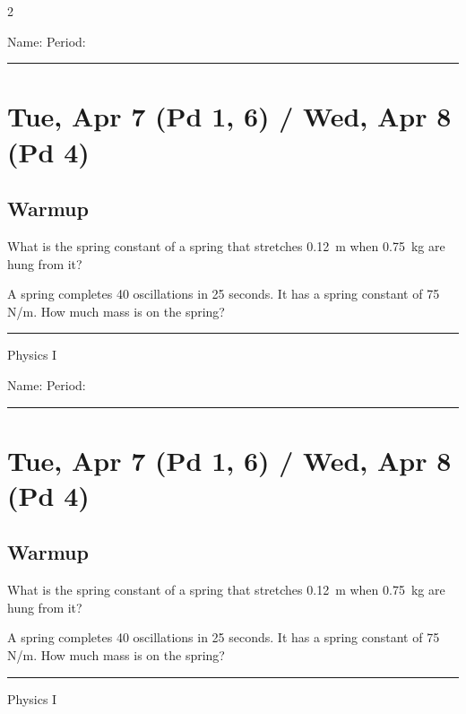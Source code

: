 \documentclass[10pt,landscape]{exam}
\def\todayDate{Tue, Apr 7 (Pd 1, 6) / Wed, Apr 8 (Pd 4)}
\def\content{
  \begin{questions}
    \question
      What is the spring constant of a spring that stretches 0.12~m when 0.75~kg are hung from it?
      \vspace{18em}

    \question
      A spring completes 40 oscillations in 25 seconds.  It has a spring constant of 75 N/m.  How much mass is on the spring?
  \end{questions}

}
\begin{document}
\pagestyle{empty}

\setlength{\columnsep}{0.8in}
\begin{multicols*}{2}

\noindent  
Name: \hfill Period: \hspace{5em}
\vspace{0.5em}
\hrule

\section*{\todayDate}
\subsection*{Warmup}

\content

\vfill
\hrule
\vspace{0.5em}
\hfill {\sc Physics I}

\columnbreak

\noindent  
Name: \hfill Period: \hspace{5em}
\vspace{0.5em}
\hrule

\section*{\todayDate}
\subsection*{Warmup}

\content

\vfill
\hrule
\vspace{0.5em}
\hfill {\sc Physics I}

\end{multicols*}
\end{document}
